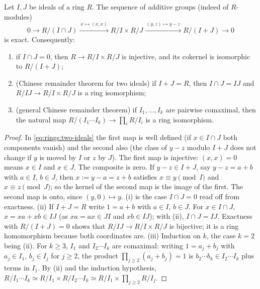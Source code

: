 \begin{proposition}\label{prop:rings:two-ideals}
Let $I,J$ be ideals of a ring $R$. The sequence of additive groups (indeed of $R$-modules)
\begin{equation}\label{eq:rings:two-ideals}
0\longrightarrow R/(I\cap J)\xrightarrow{\ x\mapsto(x,x)\ }R/I\times R/J\xrightarrow{\ (y,z)\mapsto y-z\ }R/(I+J)\longrightarrow0
\end{equation}
is exact. Consequently:
\begin{enumerate}[label=(\roman*)]
\item if $I\cap J=0$, then $R\to R/I\times R/J$ is injective, and its cokernel is isomorphic to $R/(I+J)$;
\item (Chinese remainder theorem for two ideals) if $I+J=R$, then $I\cap J=IJ$ and $R/IJ\to R/I\times R/J$ is a ring isomorphism;
\item (general Chinese remainder theorem) if $I_1,\dots,I_k$ are pairwise comaximal, then the natural map
$R/(I_1\cdots I_k)\to\prod_iR/I_i$ is a ring isomorphism.
\end{enumerate}
\end{proposition}

\begin{proof}
In \eqref{eq:rings:two-ideals} the first map is well defined (if $x\in I\cap J$ both components vanish) and the second also
(the class of $y-z$ modulo $I+J$ does not change if $y$ is moved by $I$ or $z$ by $J$). The first map is injective: $(x,x)=0$
means $x\in I$ and $x\in J$. The composite is zero. If $y-z\in I+J$, say $y-z=a+b$ with $a\in I$, $b\in J$, then $x:=y-a=z+b$
satisfies $x\equiv y\pmod I$ and $x\equiv z\pmod J$; so the kernel of the second map is the image of the first. The second map is
onto, since $(y,0)\mapsto y$.
(i) is the case $I\cap J=0$ read off from exactness.
(ii) If $I+J=R$ write $1=a+b$ with $a\in I$, $b\in J$. For $x\in I\cap J$, $x=xa+xb\in IJ$ (as $xa=ax\in JI$ and $xb\in IJ$); with
(ii), $I\cap J=IJ$. Exactness with $R/(I+J)=0$ shows that $R/IJ\to R/I\times R/J$ is bijective; it is a ring
homomorphism because both coordinates are.
(iii) Induction on $k$, the case $k=2$ being (ii). For $k\ge3$, $I_1$ and $I_2\cdots I_k$ are comaximal: writing $1=a_j+b_j$ with
$a_j\in I_1$, $b_j\in I_j$ for $j\ge2$, the product $\prod_{j\ge2}(a_j+b_j)=1$ is $b_2\cdots b_k\in I_2\cdots I_k$ plus terms in $I_1$. By (ii) and
the induction hypothesis, $R/I_1\cdots I_k\simeq R/I_1\times R/I_2\cdots I_k\simeq R/I_1\times\prod_{j\ge2}R/I_j$.
\end{proof}


